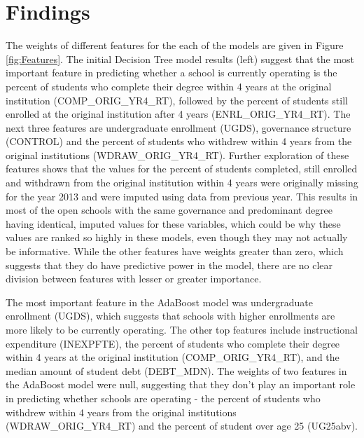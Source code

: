 \documentclass[11pt, letterpaper]{article}
\begin{document}
\section{Findings}
The weights of different features for the each of the models are given in Figure \ref{fig:Features}. The initial Decision Tree model results (left) suggest that the most important feature in predicting whether a school is currently operating is the percent of students who complete their degree within 4 years at the original institution (COMP\_ORIG\_YR4\_RT), followed by the percent of students still enrolled at the original institution after 4 years (ENRL\_ORIG\_YR4\_RT). The next three features are undergraduate enrollment (UGDS), governance structure (CONTROL) and the percent of students who withdrew within 4 years from the original institutions (WDRAW\_ORIG\_YR4\_RT). Further exploration of these features shows that the values for the percent of students completed, still enrolled and withdrawn from the original institution within 4 years were originally missing for the year 2013 and were imputed using data from previous year. This results in most of the open schools with the same governance and predominant degree having identical, imputed values for these variables, which could be why these values are ranked so highly in these models, even though they may not actually be informative. While the other features have weights greater than zero, which suggests that they do have predictive power in the model, there are no clear division between features with lesser or greater importance.

The most important feature in the AdaBoost model was undergraduate enrollment (UGDS), which suggests that schools with higher enrollments are more likely to be currently operating. The other top features include instructional expenditure (INEXPFTE), the percent of students who complete their degree within 4 years at the original institution (COMP\_ORIG\_YR4\_RT), and the median amount of student debt (DEBT\_MDN). The weights of two features in the AdaBoost model were null, suggesting that they don't play an important role in predicting whether schools are operating -  the percent of students who withdrew within 4 years from the original institutions (WDRAW\_ORIG\_YR4\_RT) and the percent of student over age 25 (UG25abv).

\end{document}

